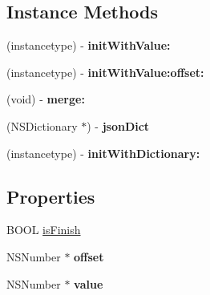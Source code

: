 \subsection*{Instance Methods}
\begin{DoxyCompactItemize}
\item 
\mbox{\label{interface_app_monitor_measure_value_aa14876e0ced7536782d284482b20c655}} 
(instancetype) -\/ {\bfseries init\+With\+Value\+:}
\item 
\mbox{\label{interface_app_monitor_measure_value_a5be1b11630102def2d88756cc19a2fa9}} 
(instancetype) -\/ {\bfseries init\+With\+Value\+:offset\+:}
\item 
\mbox{\label{interface_app_monitor_measure_value_a08fc351218758891ee5a908203405b6b}} 
(void) -\/ {\bfseries merge\+:}
\item 
\mbox{\label{interface_app_monitor_measure_value_a24b51b2f8d4295f40d22c32cef53af8d}} 
(N\+S\+Dictionary $\ast$) -\/ {\bfseries json\+Dict}
\item 
\mbox{\label{interface_app_monitor_measure_value_aa8a8015faf1cb846745754e4a6ede458}} 
(instancetype) -\/ {\bfseries init\+With\+Dictionary\+:}
\end{DoxyCompactItemize}
\subsection*{Properties}
\begin{DoxyCompactItemize}
\item 
B\+O\+OL \mbox{\hyperlink{interface_app_monitor_measure_value_a96e491c9a716f5347694bec46341bdc7}{is\+Finish}}
\item 
\mbox{\label{interface_app_monitor_measure_value_a8a4fdf9d2cc211411ed008a5c9cc16bc}} 
N\+S\+Number $\ast$ {\bfseries offset}
\item 
\mbox{\label{interface_app_monitor_measure_value_af08af1e4b92b81eac20e2e10891fd38a}} 
N\+S\+Number $\ast$ {\bfseries value}
\end{DoxyCompactItemize}


